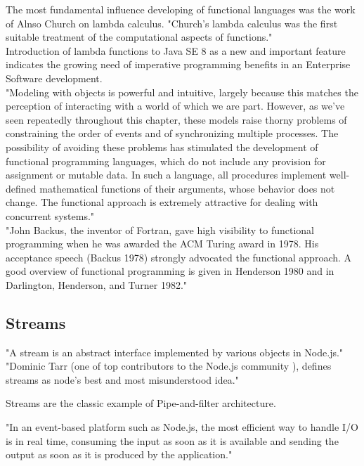 \documentclass{llncs}
\begin{document}
The most fundamental influence developing of functional languages was the work of Alnso Church on lambda calculus. "Church’s lambda calculus was the first suitable treatment of the computational aspects of functions."\cite{Hudak}\\

Introduction of lambda functions to Java SE 8 as a new and important feature\cite{javase} indicates the growing need of imperative programming benefits in an Enterprise Software development.\\

"Modeling with objects is powerful and intuitive, largely because this matches the perception of interacting with a world of which we are part. However, as we've seen repeatedly throughout this chapter, these models raise thorny problems of constraining the order of events and of synchronizing multiple processes. The possibility of avoiding these problems has stimulated the development of functional programming languages, which do not include any provision for assignment or mutable data. In such a language, all procedures implement well-defined mathematical functions of their arguments, whose behavior does not change. The functional approach is extremely attractive for dealing with concurrent systems." \cite{sicp}\\

"John Backus, the inventor of Fortran, gave high visibility to functional programming when he was awarded the ACM Turing award in 1978. His acceptance speech (Backus 1978) strongly advocated the functional approach. A good overview of functional programming is given in Henderson 1980 and in Darlington, Henderson, and Turner 1982."\cite{sicp}\\

\subsection{Streams}
"A stream is an abstract interface implemented by various objects in Node.js." \cite{nodejsstreams}
"Dominic Tarr (one of top contributors to the Node.js community \cite{nodejscontributors}), defines streams as node's best and most misunderstood idea."\cite{nodejsbook}

Streams are the classic example of Pipe-and-filter architecture.

"In an event-based platform such as Node.js, the most efficient way to handle I/O is in real time, consuming the input as soon as it is available and sending the output as soon as it is produced by the application."\cite{nodejsbook}
\end{document}
